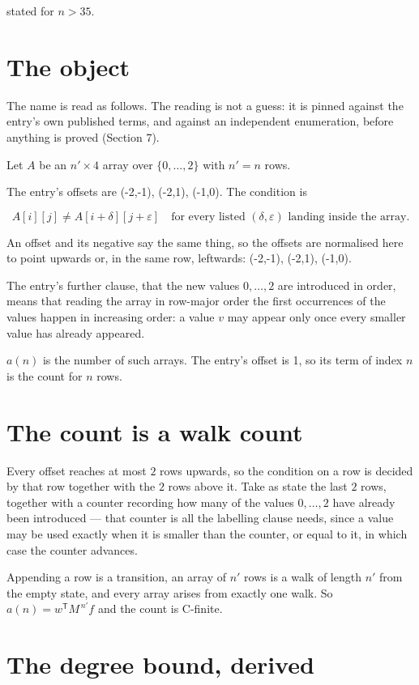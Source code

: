 \documentclass[11pt]{article}
\theoremstyle{definition}
\begin{document}
stated for $n > 35$.

\section{The object}

The name is read as follows. The reading is not a guess: it is pinned against the entry's own published terms, and against an independent enumeration, before anything is proved (Section 7).

Let $A$ be an $n' \times 4$ array over $\{0,\dots,2\}$ with $n' = n$ rows.

The entry's offsets are (-2,-1), (-2,1), (-1,0). The condition is

\[A[i][j] \ne A[i{+}\delta][j{+}\varepsilon]\quad\text{for every listed }(\delta,\varepsilon)\text{ landing inside the array.}\]

An offset and its negative say the same thing, so the offsets are normalised here to point upwards or, in the same row, leftwards: (-2,-1), (-2,1), (-1,0).

The entry's further clause, that the new values $0,\dots,2$ are introduced in order, means that reading the array in row-major order the first occurrences of the values happen in increasing order: a value $v$ may appear only once every smaller value has already appeared.

$a(n)$ is the number of such arrays. The entry's offset is 1, so its term of index $n$ is the count for $n$ rows.

\section{The count is a walk count}

Every offset reaches at most $2$ rows upwards, so the condition on a row is decided by that row together with the $2$ rows above it. Take as state the last $2$ rows, together with a counter recording how many of the values $0,\dots,2$ have already been introduced --- that counter is all the labelling clause needs, since a value may be used exactly when it is smaller than the counter, or equal to it, in which case the counter advances.

Appending a row is a transition, an array of $n'$ rows is a walk of length $n'$ from the empty state, and every array arises from exactly one walk. So $a(n) = w^{\mathsf T}M^{\,n'}f$ and the count is C-finite.

\section{The degree bound, derived}
\end{document}
